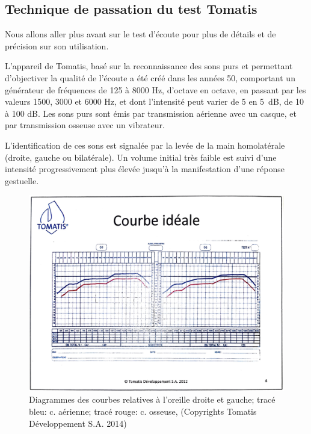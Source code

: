 \subsection{Technique de passation du test Tomatis}
Nous allons aller plus avant sur le test d'écoute pour plus de détails et de précision sur son utilisation.

L'appareil de Tomatis, basé sur la reconnaissance des sons purs  \autocite [34--35]{tomatis_oreille_1991}
et
permettant d'objectiver la qualité de l'écoute
 a été créé dans les années 50, comportant un générateur de fréquences
  de 125 à 8000 Hz, d'octave en octave, en passant par les valeurs
1500, 3000 et 6000 Hz, et dont l'intensité peut varier de 5 en \SI{5}{\dB}, de 10 à 100 dB.
Les sons purs sont émis par 
  transmission aérienne avec un casque, et par transmission osseuse
  avec un vibrateur.

  L'identification de ces sons est
  signalée par la levée de la main homolatérale (droite, gauche ou
  bilatérale).
Un volume initial très faible est suivi d'une intensité
progressivement plus élevée jusqu'à la manifestation d'une réponse gestuelle.



\begin{figure}
	\centering
	\includegraphics[width=1\linewidth]{images/graphiques/courbeideale.png}
	\caption[Courbe idéale]{Diagrammes des courbes relatives à l'oreille droite et
          gauche; tracé bleu: c. aérienne; tracé rouge: c.
          osseuse, (Copyrights Tomatis Développement S.A.  2014) }
	\label{Courbe idéale}
\end{figure}




